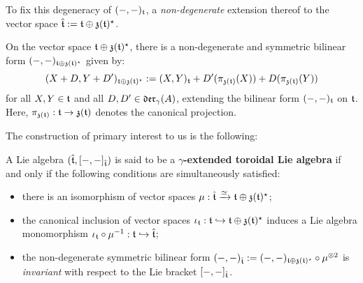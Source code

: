        To fix this degeneracy of $(-, -)_{\mathfrak{t}}$, a \textit{non-degenerate} extension thereof to the vector space $\hat{\mathfrak{t}} := \mathfrak{t} \oplus \mathfrak{z}(\mathfrak{t})^{\star}$.
        \begin{proposition} \label{prop: extended_toroidal_bilinear_form}
            On the vector space $\mathfrak{t} \oplus \mathfrak{z}(\mathfrak{t})^{\star}$, there is a non-degenerate and symmetric bilinear form $(-, -)_{\mathfrak{t} \oplus \mathfrak{z}(\mathfrak{t})^{\star}}$ given by:
                $$( X + D, Y + D' )_{\mathfrak{t} \oplus \mathfrak{z}(\mathfrak{t})^{\star}} := (X, Y)_{\mathfrak{t}} + D'( \pi_{\mathfrak{z}(\mathfrak{t})}(X) ) + D( \pi_{\mathfrak{z}(\mathfrak{t})}(Y) )$$
            for all $X, Y \in \mathfrak{t}$ and all $D, D' \in \mathfrak{der}_{\gamma}(A)$, extending the bilinear form $(-, -)_{\mathfrak{t}}$ on $\mathfrak{t}$. Here, $\pi_{\mathfrak{z}(\mathfrak{t})}: \mathfrak{t} \to \mathfrak{z}(\mathfrak{t})$ denotes the canonical projection.
        \end{proposition}

        The construction of primary interest to us is the following:
        \begin{definition} \label{def: yangian_extended_toroidal_lie_algebras}
            A Lie algebra $(\hat{\mathfrak{t}}, [-, -]_{\hat{\mathfrak{t}}})$ is said to be a \textbf{$\gamma$-extended toroidal Lie algebra} if and only if the following conditions are simultaneously satisfied:
            \begin{itemize}
                \item there is an isomorphism of vector spaces $\mu: \hat{\mathfrak{t}} \xrightarrow[]{\simeq} \mathfrak{t} \oplus \mathfrak{z}(\mathfrak{t})^{\star}$;
                \item the canonical inclusion of vector spaces $\iota_{\mathfrak{t}}: \mathfrak{t} \hookrightarrow \mathfrak{t} \oplus \mathfrak{z}(\mathfrak{t})^{\star}$ induces a Lie algebra monomorphism $\iota_{\mathfrak{t}} \circ \mu^{-1}: \mathfrak{t} \hookrightarrow \hat{\mathfrak{t}}$;
                \item the non-degenerate symmetric bilinear form $(-, -)_{\extendedtoroidal} := (-, -)_{\toroidal \oplus \z(\toroidal)^{\star}} \circ \mu^{\tensor 2}$ is \textit{invariant} with respect to the Lie bracket $[-, -]_{\hat{\mathfrak{t}}}$.
            \end{itemize}
        \end{definition}